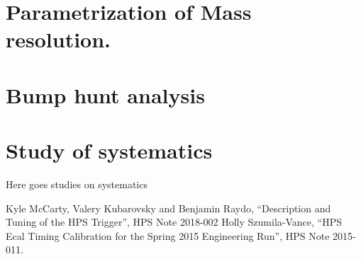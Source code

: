 \documentclass[letterpaper,12pt]{article}
\begin{document}
\section{Parametrization of Mass resolution.}

\section{Bump hunt analysis}


\section{Study of systematics}
Here goes studies on systematics

\begin{thebibliography}{55}
  Kyle McCarty, Valery Kubarovsky and Benjamin Raydo, ``Description and Tuning of the HPS Trigger'', HPS Note 2018-002
  Holly Szumila-Vance, ``HPS Ecal Timing Calibration for the
Spring 2015 Engineering Run'', HPS Note 2015-011.
\end{thebibliography}

 
\end{document}

